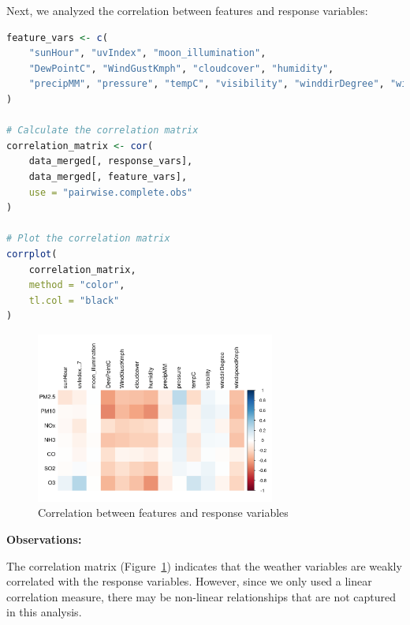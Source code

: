 \documentclass[12pt]{article}
\begin{document}
Next, we analyzed the correlation between features and response variables:

\begin{lstlisting}[language=R]
feature_vars <- c(
    "sunHour", "uvIndex", "moon_illumination",
    "DewPointC", "WindGustKmph", "cloudcover", "humidity",
    "precipMM", "pressure", "tempC", "visibility", "winddirDegree", "windspeedKmph"
)

# Calculate the correlation matrix
correlation_matrix <- cor(
    data_merged[, response_vars],
    data_merged[, feature_vars],
    use = "pairwise.complete.obs"
)

# Plot the correlation matrix
corrplot(
    correlation_matrix,
    method = "color",
    tl.col = "black"
)
\end{lstlisting}

\begin{figure}[H]
    \centering
    \includegraphics[width=0.7\textwidth]{feature-response-correlation.png}
    \caption{Correlation between features and response variables}
    \label{fig:feature_response_correlation}
\end{figure}

\textbf{Observations:}

The correlation matrix (Figure~\ref{fig:feature_response_correlation}) indicates that the weather variables are weakly correlated with the response variables. However, since we only used a linear correlation measure, there may be non-linear relationships that are not captured in this analysis.

\newpage


\end{document}
